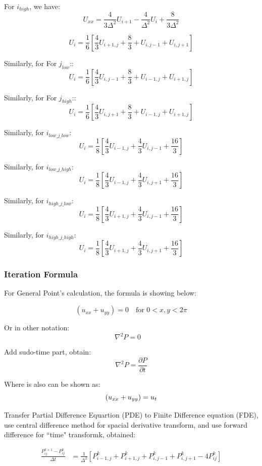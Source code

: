 \documentclass[12pt]{article}
\begin{document}
For $i_{high}$, we have:
\[ U_{xx} = \frac{4}{3\Delta^2} U_{i+1} - \frac{4}{\Delta^2} U_{i} + \frac{8}{3\Delta^2}  \]

\[ U_i = \frac{1}{6} \left[ \frac{4}{3} U_{i+1,j} + \frac{8}{3}+ U_{i,j-1} + U_{i,j+1} \right] \]

Similarly, for For $j_{low}$::
\[ U_i = \frac{1}{6} \left[ \frac{4}{3} U_{i,j-1} + \frac{8}{3}+ U_{i-1,j} + U_{i+1,j} \right] \]

Similarly, for For $j_{high}$::
\[ U_i = \frac{1}{6} \left[ \frac{4}{3} U_{i,j+1} + \frac{8}{3}+ U_{i-1,j} + U_{i+1,j} \right] \]

Similarly, for $i_{low\_j\_low}$:
\[ U_i = \frac{1}{8} \left[ \frac{4}{3} U_{i-1,j} + \frac{4}{3} U_{i,j-1} + \frac{16}{3} \right] \]

Similarly, for $i_{low\_j\_high}$:
\[ U_i = \frac{1}{8} \left[ \frac{4}{3}U_{i-1,j} + \frac{4}{3} U_{i,j+1} + \frac{16}{3} \right] \]

Similarly, for $i_{high\_j\_low}$:
\[ U_i = \frac{1}{8} \left[ \frac{4}{3} U_{i+1,j} + \frac{4}{3} U_{i,j-1} + \frac{16}{3} \right] \]

Similarly, for $i_{high\_j\_high}$:
\[ U_i = \frac{1}{8} \left[ \frac{4}{3} U_{i+1,j} + \frac{4}{3} U_{i,j+1} + \frac{16}{3}  \right] \]


\subsubsection{Iteration Formula}
For General Point's calculation, the formula is showing below:

\begin{equation*}
    (u_{xx} + u_{yy}) = 0 \quad \text{for } 0 < x,y < 2\pi
\end{equation*}

Or in other notation: $$\nabla^2 P = 0 \quad $$


Add sudo-time part, obtain:
$$\nabla^2 P = \frac{\partial P}{\partial t}$$


Where is also can be shown as: 
\begin{equation*}
    (u_{xx} + u_{yy}) = u_{t} \\
\end{equation*}

Transfer Partial Difference Equartion (PDE) to Finite Difference equation
(FDE), use central difference method for spacial derivative transform, and
use forward difference for ``time" transformk, obtained:

\begin{align*}
    \frac{P_{ij}^{k+1} - P_{ij}^k}{\Delta t} &= \frac{1}{\Delta^2} \left[ P_{i-1,j}^k + P_{i+1,j}^k + P_{i,j-1}^k + P_{i,j+1}^k - 4P_{ij}^k \right]
\end{align*}
\end{document}
